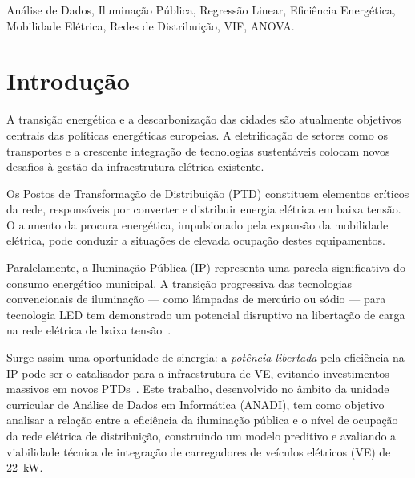 \documentclass[conference]{IEEEtran}
\begin{document}
\begin{IEEEkeywords}
Análise de Dados, Iluminação Pública, Regressão Linear, Eficiência Energética, Mobilidade Elétrica, Redes de Distribuição, VIF, ANOVA.
\end{IEEEkeywords}

\section{Introdução}

A transição energética e a descarbonização das cidades são atualmente objetivos centrais das políticas energéticas europeias. A eletrificação de setores como os transportes e a crescente integração de tecnologias sustentáveis colocam novos desafios à gestão da infraestrutura elétrica existente.

Os Postos de Transformação de Distribuição (PTD) constituem elementos críticos da rede, responsáveis por converter e distribuir energia elétrica em baixa tensão. O aumento da procura energética, impulsionado pela expansão da mobilidade elétrica, pode conduzir a situações de elevada ocupação destes equipamentos.

Paralelamente, a Iluminação Pública (IP) representa uma parcela significativa do consumo energético municipal. A transição progressiva das tecnologias convencionais de iluminação --- como lâmpadas de mercúrio ou sódio --- para tecnologia LED tem demonstrado um potencial disruptivo na libertação de carga na rede elétrica de baixa tensão~\cite{b4}.

Surge assim uma oportunidade de sinergia: a \emph{potência libertada} pela eficiência na IP pode ser o catalisador para a infraestrutura de VE, evitando investimentos massivos em novos PTDs~\cite{b4}. Este trabalho, desenvolvido no âmbito da unidade curricular de Análise de Dados em Informática (ANADI), tem como objetivo analisar a relação entre a eficiência da iluminação pública e o nível de ocupação da rede elétrica de distribuição, construindo um modelo preditivo e avaliando a viabilidade técnica de integração de carregadores de veículos elétricos (VE) de 22~kW.
\end{document}
